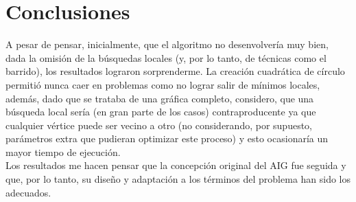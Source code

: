 \documentclass[a4paper]{report}
\begin{document}
  \chapter{Conclusiones}                                                     
  A pesar de pensar, inicialmente, que el algoritmo no desenvolver\'ia muy bien, dada la omisi\'on
  de la b\'usquedas locales (y, por lo tanto, de t\'ecnicas como el barrido), los resultados
  lograron sorprenderme. La creaci\'on cuadr\'atica de c\'irculo permiti\'o nunca caer en problemas
  como no lograr salir de m\'inimos locales, adem\'as, dado que se trataba de una gr\'afica completo,
  considero, que una b\'usqueda local ser\'ia (en gran parte de los casos) contraproducente ya que
  cualquier v\'ertice puede ser vecino a otro (no considerando, por supuesto, par\'ametros extra
  que pudieran optimizar este proceso) y esto ocasionar\'ia un mayor tiempo de ejecuci\'on.\\

  Los resultados me hacen pensar que la concepci\'on original del AIG fue seguida y que, por lo tanto,
  su dise\~no  y adaptaci\'on a los t\'erminos del problema han sido los adecuados.

  {}
  
\end{document}
